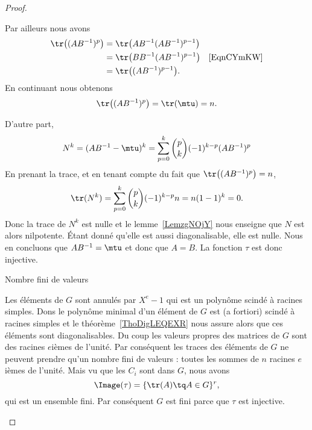 \begin{proof}
\begin{subproof}
            Par ailleurs nous avons
            \begin{subequations}
                \begin{align}
                    \tr\big( (AB^{-1})^p \big)&=\tr\big( AB^{-1}(AB^{-1})^{p-1} \big)\\
                    &=\tr\big( BB^{-1}(AB^{-1})^{p-1} \big) &\text{\eqref{EqnCYmKW}}\\
                    &=\tr\big( (AB^{-1})^{p-1} \big).
                \end{align}
            \end{subequations}
            En continuant nous obtenons
            \begin{equation}
                \tr\big(  (AB^{-1})^p \big)=\tr(\mtu)=n.
            \end{equation}

            D'autre part,
            \begin{equation}
                N^k=(AB^{-1}-\mtu)^k=\sum_{p=0}^k{p\choose k}(-1)^{k-p}(AB^{-1})^p
            \end{equation}
            En prenant la trace, et en tenant compte du fait que \( \tr\big( (AB^{-1})^p \big)=n\),
            \begin{equation}
                \tr(N^k)=\sum_{p=0}^k{p\choose k}(-1)^{k-p}n=n(1-1)^k=0.
            \end{equation}
            Donc la trace de \( N^k\) est nulle et le lemme~\ref{LemzgNOjY} nous enseigne que \( N\) est alors nilpotente. Étant donné qu'elle est aussi diagonalisable, elle est nulle. Nous en concluons que \( AB^{-1}=\mtu\) et donc que \( A=B\). La fonction \( \tau\) est donc injective.

        \item[Nombre fini de valeurs]

            Les éléments de \( G\) sont annulés par \( X^e-1\) qui est un polynôme scindé à racines simples. Dons le polynôme minimal d'un élément de \( G\) est (a fortiori) scindé à racines simples et le théorème~\ref{ThoDigLEQEXR} nous assure alors que ces éléments sont diagonalisables. Du coup les valeurs propres des matrices de \( G\) sont des racines \( e\)ièmes de l'unité. Par conséquent les traces des éléments de \( G\) ne peuvent prendre qu'un nombre fini de valeurs : toutes les sommes de \( n\) racines \( e\)ièmes de l'unité. Mais vu que les \( C_i\) sont dans \( G\), nous avons
            \begin{equation}
                \Image(\tau)=\{ \tr(A)\tq A\in G \}^r,
            \end{equation}
            qui est un ensemble fini. Par conséquent \( G\) est fini parce que \( \tau\) est injective.
    \end{subproof}
\end{proof}

